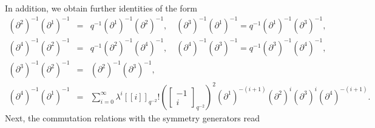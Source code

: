 \documentclass[a4paper,11pt,oneside]{article}
\begin{document}
In addition, we obtain further identities of the form 
\begin{eqnarray}
\left( \partial ^{2}\right) ^{-1}\left( \partial ^{1}\right) ^{-1}
&=&q^{-1}\left( \partial ^{1}\right) ^{-1}\left( \partial ^{2}\right)
^{-1},\quad \left( \partial ^{3}\right) ^{-1}\left( \partial ^{1}\right)
^{-1}=q^{-1}\left( \partial ^{1}\right) ^{-1}\left( \partial ^{3}\right)
^{-1}, \\
\left( \partial ^{4}\right) ^{-1}\left( \partial ^{2}\right) ^{-1}
&=&q^{-1}\left( \partial ^{2}\right) ^{-1}\left( \partial ^{4}\right)
^{-1},\quad \left( \partial ^{4}\right) ^{-1}\left( \partial ^{3}\right)
^{-1}=q^{-1}\left( \partial ^{3}\right) ^{-1}\left( \partial ^{4}\right)
^{-1},  \nonumber \\
\left( \partial ^{3}\right) ^{-1}\left( \partial ^{2}\right) ^{-1} &=&\left(
\partial ^{2}\right) ^{-1}\left( \partial ^{3}\right) ^{-1},  \nonumber \\
\left( \partial ^{4}\right) ^{-1}\left( \partial ^{1}\right) ^{-1}
&=&\sum_{i=0}^{\infty }\lambda ^{i}\left[ \left[ i\right] \right]
_{q^{-2}}!\left(\left[\begin{array}{c} -1\\i\end{array}\right]_{q^{-2}}\right) ^{2}\left( \partial
^{1}\right) ^{-\left( i+1\right) }\left( \partial ^{2}\right) ^{i}\left(
\partial ^{3}\right) ^{i}\left( \partial ^{4}\right) ^{-\left( i+1\right) }.
\nonumber
\end{eqnarray}
Next, the commutation relations with the symmetry generators read 
\end{document}
